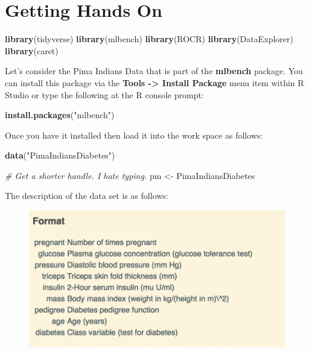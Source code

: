 \documentclass[]{book}
\newenvironment{Shaded}{\begin{snugshade}}{\end{snugshade}}
\newcommand{\KeywordTok}[1]{\textcolor[rgb]{0.13,0.29,0.53}{\textbf{#1}}}
\newcommand{\StringTok}[1]{\textcolor[rgb]{0.31,0.60,0.02}{#1}}
\newcommand{\CommentTok}[1]{\textcolor[rgb]{0.56,0.35,0.01}{\textit{#1}}}
\newcommand{\NormalTok}[1]{#1}
\begin{document}
\chapter{Getting Hands On}\label{getting-hands-on}

\begin{Shaded}
\begin{Highlighting}[]
\KeywordTok{library}\NormalTok{(tidyverse)}
\KeywordTok{library}\NormalTok{(mlbench)}
\KeywordTok{library}\NormalTok{(ROCR)}
\KeywordTok{library}\NormalTok{(DataExplorer)}
\KeywordTok{library}\NormalTok{(caret)}
\end{Highlighting}
\end{Shaded}

Let's consider the Pima Indians Data that is part of the
\textbf{mlbench} package. You can install this package via the
\textbf{Tools -\textgreater{} Install Package} menu item within R Studio
or type the following at the R console prompt:

\begin{Shaded}
\begin{Highlighting}[]
\KeywordTok{install.packages}\NormalTok{(}\StringTok{"mlbench"}\NormalTok{)}
\end{Highlighting}
\end{Shaded}

Once you have it installed then load it into the work space as follows:

\begin{Shaded}
\begin{Highlighting}[]
\KeywordTok{data}\NormalTok{(}\StringTok{"PimaIndiansDiabetes"}\NormalTok{)}

\CommentTok{# Get a shorter handle. I hate typing. }
\NormalTok{pm <-}\StringTok{ }\NormalTok{PimaIndiansDiabetes}
\end{Highlighting}
\end{Shaded}

The description of the data set is as follows:

\begin{figure}
\centering
\includegraphics[width=4.94792in]{./PICS/pima_desc.png}
\caption{}
\end{figure}
\end{document}
